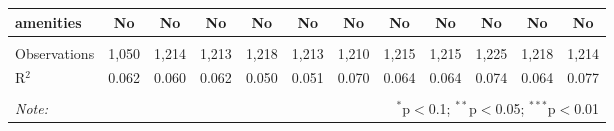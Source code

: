 \begin{table}[!htbp]
\begin{tabular}{@{\extracolsep{5pt}}lccccccccccc}
amenities & No & No & No & No & No & No & No & No & No & No & No \\ 
\hline \\[-1.8ex] 
Observations & 1,050 & 1,214 & 1,213 & 1,218 & 1,213 & 1,210 & 1,215 & 1,215 & 1,225 & 1,218 & 1,214 \\ 
R$^{2}$ & 0.062 & 0.060 & 0.062 & 0.050 & 0.051 & 0.070 & 0.064 & 0.064 & 0.074 & 0.064 & 0.077 \\ 
\hline 
\hline \\[-1.8ex] 
\textit{Note:}  & \multicolumn{11}{r}{$^{*}$p$<$0.1; $^{**}$p$<$0.05; $^{***}$p$<$0.01} \\ 
\end{tabular} 
\end{table} 
